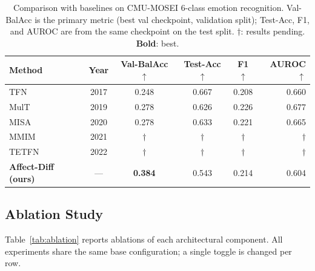 \documentclass[conference]{IEEEtran}
\begin{document}
\begin{table}[htbp]
\caption{Comparison with baselines on CMU-MOSEI 6-class emotion recognition.
Val-BalAcc is the primary metric (best val checkpoint, validation split);
Test-Acc, F1, and AUROC are from the same checkpoint on the test split.
$\dagger$: results pending. \textbf{Bold}: best.}
\label{tab:main_results}
\begin{center}
\setlength{\tabcolsep}{4pt}
\begin{tabular}{@{}lccccr@{}}
\toprule
\textbf{Method} & \textbf{Year} & \textbf{Val-BalAcc}$\uparrow$ & \textbf{Test-Acc}$\uparrow$
    & \textbf{F1}$\uparrow$ & \textbf{AUROC}$\uparrow$ \\
\midrule
TFN  \cite{zadeh2017tfn}     & 2017 & 0.248 & 0.667 & 0.208 & 0.660 \\
MulT \cite{tsai2019mult}     & 2019 & 0.278 & 0.626 & 0.226 & 0.677 \\
MISA \cite{hazarika2020misa} & 2020 & 0.278 & 0.633 & 0.221 & 0.665 \\
MMIM \cite{han2021mmim}      & 2021 & $\dagger$ & $\dagger$ & $\dagger$ & $\dagger$ \\
TETFN \cite{yang2022tetfn}   & 2022 & $\dagger$ & $\dagger$ & $\dagger$ & $\dagger$ \\
\midrule
\textbf{Affect-Diff (ours)} & --- & \textbf{0.384} & 0.543 & 0.214 & 0.604 \\
\bottomrule
\end{tabular}
\end{center}
\end{table}

\subsection{Ablation Study}

Table~\ref{tab:ablation} reports ablations of each architectural component.
All experiments share the same base configuration; a single toggle is changed
per row.
\end{document}
